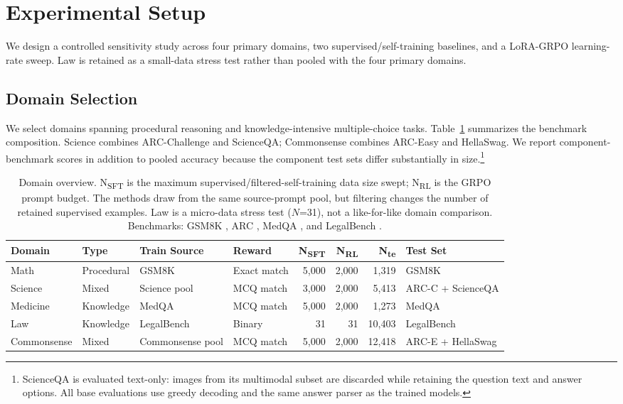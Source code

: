 \documentclass[11pt]{article}
\begin{document}
\section{Experimental Setup}

We design a controlled sensitivity study across four primary domains, two supervised/self-training baselines, and a LoRA-GRPO learning-rate sweep. Law is retained as a small-data stress test rather than pooled with the four primary domains.

\subsection{Domain Selection}

We select domains spanning procedural reasoning and knowledge-intensive multiple-choice tasks. Table~\ref{tab:domains} summarizes the benchmark composition. Science combines ARC-Challenge and ScienceQA; Commonsense combines ARC-Easy and HellaSwag. We report component-benchmark scores in addition to pooled accuracy because the component test sets differ substantially in size.\footnote{ScienceQA is evaluated text-only: images from its multimodal subset are discarded while retaining the question text and answer options. All base evaluations use greedy decoding and the same answer parser as the trained models.}

\begin{table}[t]
\centering
\small
\setlength{\tabcolsep}{4pt}
\begin{tabular}{@{}llllrrrl@{}}
\toprule
\textbf{Domain} & \textbf{Type} & \textbf{Train Source} & \textbf{Reward} & \textbf{N\textsubscript{SFT}} & \textbf{N\textsubscript{RL}} & \textbf{N\textsubscript{te}} & \textbf{Test Set} \\
\midrule
Math & Procedural & GSM8K & Exact match & 5,000 & 2,000 & 1,319 & GSM8K \\
Science & Mixed & Science pool & MCQ match & 3,000 & 2,000 & 5,413 & ARC-C + ScienceQA \\
Medicine & Knowledge & MedQA & MCQ match & 5,000 & 2,000 & 1,273 & MedQA \\
Law & Knowledge & LegalBench & Binary & 31 & 31 & 10,403 & LegalBench \\
Commonsense & Mixed & Commonsense pool & MCQ match & 5,000 & 2,000 & 12,418 & ARC-E + HellaSwag \\
\bottomrule
\end{tabular}
\caption{Domain overview. N\textsubscript{SFT} is the maximum supervised/filtered-self-training data size swept; N\textsubscript{RL} is the GRPO prompt budget. The methods draw from the same source-prompt pool, but filtering changes the number of retained supervised examples. Law is a micro-data stress test ($N$=31), not a like-for-like domain comparison. Benchmarks: GSM8K \citep{cobbe2021gsm8k}, ARC \citep{clark2018arc}, MedQA \citep{jin2021medqa}, and LegalBench \citep{guha2024legalbench}.}
\label{tab:domains}
\end{table}
\end{document}
